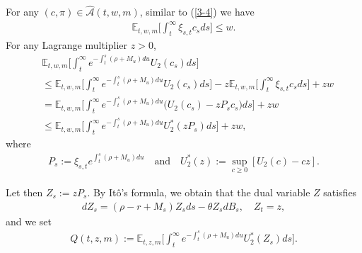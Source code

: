 \documentclass[a4paper,11pt]{amsart}
\numberwithin{equation}{section}
\newcommand{\blue}[1]{{\color{black}#1}}
\begin{document}





\blue{For any $(c,\pi)\in\widehat{\mathcal A}(t,w,m)$, similar to (\ref{3-4})} we have  
\blue{\begin{align*}
\mathbb E_{t,w,m}\bigg[\int_t^\infty\xi_{s,t}c_sds\bigg]\leq w.
\end{align*}
For any Lagrange multiplier $z>0$,}
\begin{align}\label{3-5}
 &\mathbb{E}_{t,w,m} \bigg[    \int_t^{\infty }  e^{-\int^s_t (\rho+ M_u) du} U_2(c_s)  ds  \bigg] \nonumber \\&\leq
\mathbb{E}_{t,w,m} \bigg[    \int_t^{\infty}  e^{-\int^s_t (\rho+ M_u) du} U_2(c_s)  ds  \bigg]   - z      \mathbb{E}_{t,w,m}\bigg[  \int_t^{\infty} \xi_{s,t}c_s ds                         \bigg]  +z w                 \nonumber             \\
&=   \mathbb{E}_{t,w,m}\bigg[    \int_t^{\infty }  e^{-\int^s_t (\rho+ M_u) du} \Big(U_2(c_s) -z P_sc_s\Big) ds  \bigg]+ zw  \nonumber \\
&\leq  \mathbb{E}_{t,w,m}\bigg[    \int_t^{\infty }  e^{-\int^s_t (\rho+ M_u) du} U_2^\ast(z P_s) ds  \bigg]+ zw,
\end{align}
where
\begin{align}\label{3-6}
P_s:= \xi_{s,t}e^{\int^s_t (\rho+ M_u) du } \quad \text{and} \quad U_2^\ast(z):= \sup_{c \geq 0}[U_2(c)-c z].
\end{align}

Let then $Z_s :=z P_s$. By It\^o's formula, we obtain that the dual variable $Z$ satisfies
\begin{align}\label{3-7}
dZ_s=  (\rho-r+ M_s)Z_sds - \theta Z_s dB_s, \quad Z_t= z,
\end{align}
and we set
\begin{align}\label{3-8}
Q(t,z,m):=  \mathbb{E}_{t,z,m}\bigg[    \int_t^{\infty }  e^{-\int^s_t (\rho+ M_u) du} U_2^\ast(Z_s) ds  \bigg].
\end{align}
\end{document}
